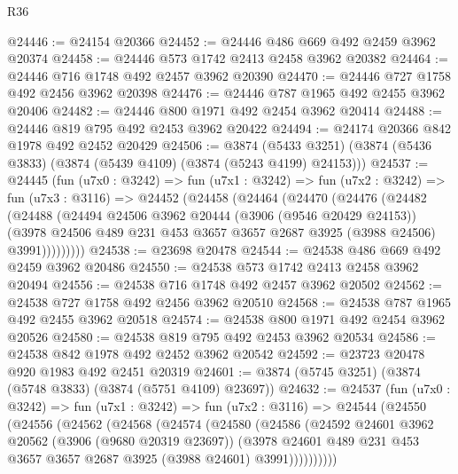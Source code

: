 \begin{lexlean}{R36}
\begin{coremodule}
@24446 := @24154 @20366
@24452 := @24446 @486 @669 @492 @2459 @3962 @20374
@24458 := @24446 @573 @1742 @2413 @2458 @3962 @20382
@24464 := @24446 @716 @1748 @492 @2457 @3962 @20390
@24470 := @24446 @727 @1758 @492 @2456 @3962 @20398
@24476 := @24446 @787 @1965 @492 @2455 @3962 @20406
@24482 := @24446 @800 @1971 @492 @2454 @3962 @20414
@24488 := @24446 @819 @795 @492 @2453 @3962 @20422
@24494 := @24174 @20366 @842 @1978 @492 @2452 @20429
@24506 := @3874
    (@5433 @3251)
    (@3874 (@5436 @3833) (@3874 (@5439 @4109) (@3874 (@5243 @4199) @24153)))
@24537 := @24445
    (fun (u7x0 : @3242) =>
    fun (u7x1 : @3242) =>
    fun (u7x2 : @3242) =>
    fun (u7x3 : @3116) =>
    @24452
      (@24458
        (@24464
          (@24470
            (@24476
              (@24482
                (@24488
                  (@24494
                    @24506
                    @3962
                    @20444
                    (@3906 (@9546 @20429 @24153))
                    (@3978
                      @24506
                      @489
                      @231
                      @453
                      @3657
                      @3657
                      @2687
                      @3925
                      (@3988 @24506)
                      @3991)))))))))
@24538 := @23698 @20478
@24544 := @24538 @486 @669 @492 @2459 @3962 @20486
@24550 := @24538 @573 @1742 @2413 @2458 @3962 @20494
@24556 := @24538 @716 @1748 @492 @2457 @3962 @20502
@24562 := @24538 @727 @1758 @492 @2456 @3962 @20510
@24568 := @24538 @787 @1965 @492 @2455 @3962 @20518
@24574 := @24538 @800 @1971 @492 @2454 @3962 @20526
@24580 := @24538 @819 @795 @492 @2453 @3962 @20534
@24586 := @24538 @842 @1978 @492 @2452 @3962 @20542
@24592 := @23723 @20478 @920 @1983 @492 @2451 @20319
@24601 := @3874 (@5745 @3251) (@3874 (@5748 @3833) (@3874 (@5751 @4109) @23697))
@24632 := @24537
    (fun (u7x0 : @3242) =>
    fun (u7x1 : @3242) =>
    fun (u7x2 : @3116) =>
    @24544
      (@24550
        (@24556
          (@24562
            (@24568
              (@24574
                (@24580
                  (@24586
                    (@24592
                      @24601
                      @3962
                      @20562
                      (@3906 (@9680 @20319 @23697))
                      (@3978
                        @24601
                        @489
                        @231
                        @453
                        @3657
                        @3657
                        @2687
                        @3925
                        (@3988 @24601)
                        @3991))))))))))

\end{coremodule}
\end{lexlean}
